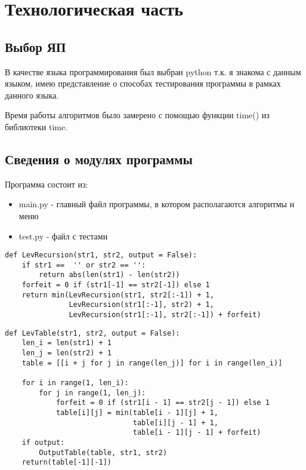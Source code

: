 \documentclass[12pt]{report}
\begin{document}
\chapter{Технологическая часть}
\section{Выбор ЯП}
В качестве языка программирования был выбран python т.к. я знакома с данным языком, имею представление о способах тестирования программы в рамках данного языка.

Время работы алгоритмов было замерено с помощью функции time() из библиотеки time.

\section{Сведения о модулях программы}
Программа состоит из:
\begin{itemize}
	\item main.py - главный файл программы, в котором располагаются алгоритмы и меню
	\item test.py - файл с тестами 
\end{itemize}

\begin{lstlisting}[label=some-code,caption=Функция нахождения расстояния Левенштейна рекурсивно]
def LevRecursion(str1, str2, output = False):
    if str1 ==  '' or str2 == '':
        return abs(len(str1) - len(str2))
    forfeit = 0 if (str1[-1] == str2[-1]) else 1
    return min(LevRecursion(str1, str2[:-1]) + 1,
               LevRecursion(str1[:-1], str2) + 1,
               LevRecursion(str1[:-1], str2[:-1]) + forfeit)
\end{lstlisting}

\begin{lstlisting}[label=some-code,caption=Функция нахождения расстояния Левенштейна матрично]
def LevTable(str1, str2, output = False):
    len_i = len(str1) + 1
    len_j = len(str2) + 1
    table = [[i + j for j in range(len_j)] for i in range(len_i)]
    
    for i in range(1, len_i):
        for j in range(1, len_j):
            forfeit = 0 if (str1[i - 1] == str2[j - 1]) else 1
            table[i][j] = min(table[i - 1][j] + 1,
                              table[i][j - 1] + 1,
                              table[i - 1][j - 1] + forfeit)
    if output:        
        OutputTable(table, str1, str2)
    return(table[-1][-1])
\end{lstlisting}
\end{document}
